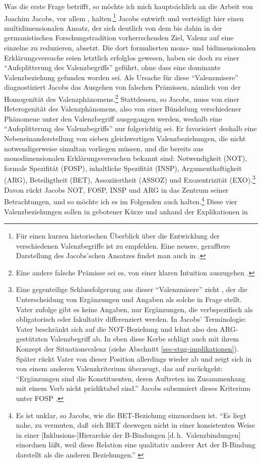 Was die erste Frage betrifft, so möchte ich mich hauptsächlich an die Arbeit von Joachim Jacobs, vor allem \cite{Jacobs:94}, halten.\footnote{Für einen kurzen historischen Überblick über die Entwicklung der verschiedenen Valenzbegriffe ist \citet[208-215]{Helbig:73} zu empfehlen. Eine neuere, gerafftere Darstellung des Jacobs'schen Ansatzes findet man auch in \citet[369ff]{Zifonun:03}.} Jacobs entwirft und verteidigt hier einen multidimensionalen Ansatz, der sich deutlich von dem bis dahin in der germanistischen Forschungstradition vorherrschenden Ziel, Valenz auf eine einzelne  zu reduzieren, absetzt. Die dort formulierten mono- und bidimensionalen Erklärungsversuche seien letztlich erfolglos gewesen, haben sie doch zu einer "`Aufsplitterung des Valenzbegriffs"' geführt, ohne dass eine dominante Valenzbeziehung gefunden worden sei. Als Ursache für diese "`Valenz\-misere"' diagnostiziert Jacobs das Ausgehen von falschen Prämissen, nämlich von der Homogenität des Valenzphänomens.\footnote{Eine andere falsche Prämisse sei es, von einer klaren Intuition auszugehen \citep[Fußnote 8]{Jacobs:94}.} Stattdessen, so Jacobs, muss von einer Heterogenität des Valenzphänomens, also von einer Bündelung verschiedener Phänomene unter den Valenzbegriff ausgegangen werden, weshalb eine "`Aufsplitterung des Valenzbegriffs"' nur folgerichtig sei. Er favorisiert deshalb eine Nebeneinanderstellung von sieben gleichwertigen Valenzbeziehungen, die nicht notwendigerweise simultan vorliegen müssen, und die bereits aus mo\-no\-dimensionalen Erklärungsversuchen bekannt sind: Notwendigkeit (NOT), formale Spezifität (FOSP), inhaltliche Spezifität (INSP), Argumenthaftigkeit (ARG), Beteiligtheit (BET), Assoziiertheit (ASSOZ) und Exozentrizität (EXO).\footnote{\label{fn-valenz-vater}Eine gegenteilige Schlussfolgerung aus dieser "`Valenzmisere"' zieht \cite{Vater:78}, der die Unterscheidung von Ergänzungen und Angaben als solche in Frage stellt. Vater zufolge gibt es keine Angaben, nur Ergänzungen, die verbspezifisch als obligatorisch oder fakultativ differenziert werden. In Jacobs' Terminologie: Vater beschränkt sich auf die NOT-Beziehung und lehnt also den ARG-gestützten Valenzbegriff ab. In eben diese Kerbe schlägt auch \cite{Storrer:92} mit ihrem Konzept der Situationsvalenz (siehe Abschnitt \ref{sec-stug-implikationen}). Später rückt Vater von dieser Position allerdings wieder ab und zeigt sich in \citet[227]{Vater:81} von einem anderen Valenzkriterium überzeugt, das auf \cite{Hoehle:78} zurückgeht: "`Ergänzungen sind die Konstituenten, deren Auftreten im Zusammenhang mit einem Verb nicht prädiktabel sind."' Jacobs subsumiert dieses Kriterium unter FOSP \citep[44]{Jacobs:94}.} Davon rückt Jacobs NOT, FOSP, INSP und ARG in das Zentrum seiner Betrachtungen, und so möchte ich es im Folgenden auch halten.\footnote{Es ist unklar, so Jacobs, wie die BET-Beziehung einzuordnen ist. "`Es liegt nahe, zu vermuten, da\ss \ sich BET deswegen nicht in einer konsistenten Weise in einer [Inklusions-]Hierarchie der B-Bindungen [d.\,h.\ Valenzbindungen] einordnen lä\ss t, weil diese Relation eine qualitativ anderer Art der B-Bindung darstellt als die anderen Beziehungen."' \citep[66]{Jacobs:94}} Diese vier Valenzbeziehungen sollen in gebotener Kürze und anhand der Explikationen in 